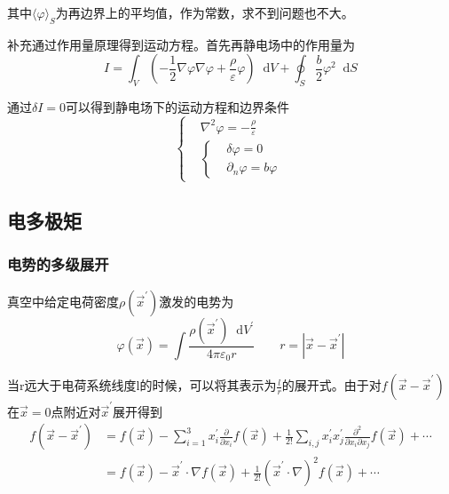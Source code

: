\documentclass[UTF8]{ctexart}
\newcommand*{\dif}{\mathop{}\!\mathrm{d}}
\begin{document}
\noindent 其中$\langle\varphi\rangle_{S}$为再边界上的平均值，作为常数，求不到问题也不大。

    补充通过作用量原理得到运动方程。首先再静电场中的作用量为
    \begin{equation}
        I = \int_V \left(- \frac{1}{2} \nabla \varphi \nabla \varphi + \frac{\rho}{\varepsilon}\varphi\right)\dif V + \oint_S \frac{b}{2} \varphi^2 \dif S
    \end{equation}

\noindent 通过$\delta I =0$可以得到静电场下的运动方程和边界条件
\begin{equation}
    \left\{\begin{aligned}
        &\nabla^2 \varphi = - \frac{\rho }{\varepsilon}\\
        & \left\{\begin{aligned}
            &\delta \varphi = 0 \\
            &\partial_n \varphi = b \varphi
        \end{aligned}\right.
    \end{aligned}\right.
\end{equation}

    \subsection{电多极矩}
    \subsubsection{电势的多级展开}
    真空中给定电荷密度$\rho(\vec{x}^{\prime})$激发的电势为
    \begin{equation}
        \varphi(\vec{x}) = \int \frac{\rho(\vec{x}^{\prime}) \dif V^{\prime}}{4 \pi \varepsilon_0 r} \qquad r = |\vec{x} - \vec{x}^{\prime}|
    \end{equation}

\noindent 当r远大于电荷系统线度l的时候，可以将其表示为$\frac{l}{r}$的展开式。由于对$f(\vec{x}- \vec{x}^{\prime})$在$\vec{x}=0$点附近对$\vec{x}^{\prime}$展开得到
\begin{equation}
    \begin{aligned}
        f\left(\vec{x}-\vec{x}^{\prime}\right) &=f(\vec{x})-\sum_{i=1}^{3} x_i^{\prime} \frac{\partial}{\partial x_i} f(\vec{x})+\frac{1}{2 !} \sum_{i, j} x_i^{\prime} x_j^{\prime} \frac{\partial^{2}}{\partial x_i \partial x_j} f(\vec{x})+\cdots \\
        &=f(\vec{x})-\vec{x}^{\prime} \cdot \nabla f(\vec{x})+\frac{1}{2 !}\left(\vec{x}^{\prime} \cdot \nabla\right)^{2} f(\vec{x})+\cdots
        \end{aligned}
\end{equation}
\end{document}
